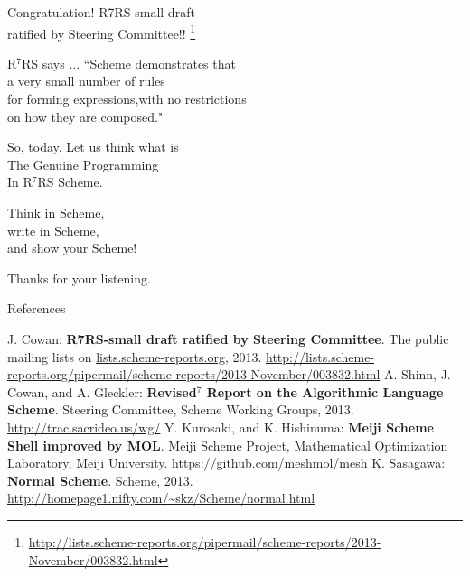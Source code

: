 \documentclass[dvipdfm,12pt,fleqn]{beamer}
\begin{document}
\begin{frame}{Congratulation!}
\pause\Huge
R7RS-small draft\\
\alert{ratified} \Large{}by Steering Committee!!
\footnote{\url{http://lists.scheme-reports.org/pipermail/scheme-reports/2013-November/003832.html}}
\end{frame}

\begin{frame}{R$^7$RS says ...}
\Large
``Scheme demonstrates that\\
\pause \alert{a very small number of rules}\\
for forming expressions,\pause with no restrictions\\
\pause \alert{on how they are composed}."
\end{frame}

\begin{frame}{So, today.}
\huge
Let us think what is\\
\alert{The Genuine Programming}\\
In R$^7$RS Scheme.
\end{frame}


\begin{frame}
\Huge
Think in Scheme,\\
write in Scheme,\\
and show \alert{your Scheme}!

\vspace{1em}
\begin{flushright}
\Large
Thanks for your listening.
\end{flushright}
\end{frame}

\begin{frame}{References}
\footnotesize
\begin{thebibliography}{9}
\beamertemplatetextbibitems
{} J. Cowan: \textbf{R7RS-small draft ratified by Steering Committee}. The public mailing lists on \url{lists.scheme-reports.org}, 2013. \url{http://lists.scheme-reports.org/pipermail/scheme-reports/2013-November/003832.html}
 A. Shinn, J. Cowan, and A. Gleckler: \textbf{Revised$^7$ Report on the Algorithmic Language Scheme}. Steering Committee, Scheme Working Groups, 2013. \url{http://trac.sacrideo.us/wg/}
 Y. Kurosaki, and K. Hishinuma: \textbf{Meiji Scheme Shell improved by MOL}. Meiji Scheme Project, Mathematical Optimization Laboratory, Meiji University. \url{https://github.com/meshmol/mesh}
 K. Sasagawa: \textbf{Normal Scheme}. Scheme, 2013. \url{http://homepage1.nifty.com/~skz/Scheme/normal.html}
\end{thebibliography}
\end{frame}
\end{document}
